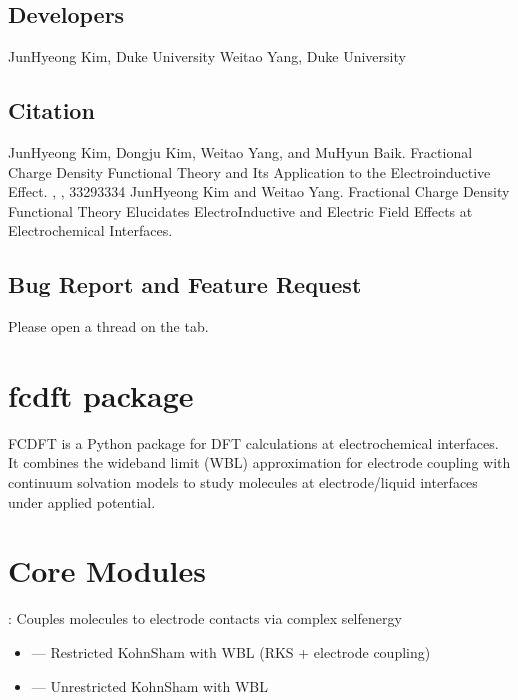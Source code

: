\documentclass[letterpaper,10pt,english]{sphinxmanual}
\begin{document}
\section{Developers}
\label{\detokenize{about:developers}}
\sphinxAtStartPar
Jun\sphinxhyphen{}Hyeong Kim, Duke University
Weitao Yang, Duke University


\section{Citation}
\label{\detokenize{about:citation}}
\sphinxAtStartPar
Jun\sphinxhyphen{}Hyeong Kim, Dongju Kim, Weitao Yang, and Mu\sphinxhyphen{}Hyun Baik. Fractional Charge Density Functional Theory and Its Application to the Electro\sphinxhyphen{}inductive Effect.  , , 3329\sphinxhyphen{}3334
Jun\sphinxhyphen{}Hyeong Kim and Weitao Yang. Fractional Charge Density Functional Theory Elucidates Electro\sphinxhyphen{}Inductive and Electric Field Effects at Electrochemical Interfaces. 


\section{Bug Report and Feature Request}
\label{\detokenize{about:bug-report-and-feature-request}}
\sphinxAtStartPar
Please open a thread on the  tab.

\sphinxstepscope


\chapter{fcdft package}
\label{\detokenize{fcdft:fcdft-package}}\label{\detokenize{fcdft::doc}}
\sphinxAtStartPar
FC\sphinxhyphen{}DFT is a Python package for DFT calculations at electrochemical interfaces.
It combines the wide\sphinxhyphen{}band limit (WBL) approximation for electrode coupling with
continuum solvation models to study molecules at electrode/liquid interfaces under
applied potential.


\chapter{Core Modules}
\label{\detokenize{fcdft:core-modules}}
\sphinxAtStartPar
{}: Couples molecules to electrode contacts via complex self\sphinxhyphen{}energy
\begin{itemize}
\item {} 
\sphinxAtStartPar
{} — Restricted Kohn\sphinxhyphen{}Sham with WBL (RKS + electrode coupling)

\item {} 
\sphinxAtStartPar
{} — Unrestricted Kohn\sphinxhyphen{}Sham with WBL

\end{itemize}
\end{document}
